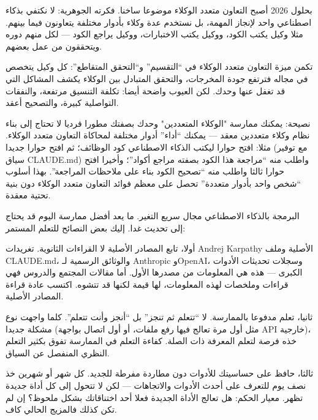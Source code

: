 
بحلول 2026 أصبح التعاون متعدد الوكلاء موضوعا ساخنا. فكرته الجوهرية: لا نكتفي بذكاء اصطناعي واحد لإنجاز المهمة، بل نستخدم عدة وكلاء بأدوار مختلفة يتعاونون فيما بينهم. مثلا وكيل يكتب الكود، ووكيل يكتب الاختبارات، ووكيل يراجع الكود — لكل منهم دوره ويتحققون من عمل بعضهم.

تكمن ميزة التعاون متعدد الوكلاء في “التقسيم” و“التحقق المتقاطع”: كل وكيل يتخصص في مجاله فترتفع جودة المخرجات، والتحقق المتبادل بين الوكلاء يكشف المشاكل التي قد تغفل عنها وحدك. لكن العيوب واضحة أيضا: تكلفة التنسيق مرتفعة، والنفقات التواصلية كبيرة، والتصحيح أعقد.

\begin{tcbinfo}{نصيحة: يمكنك ممارسة "الوكلاء المتعددين" وحدك}
بصفتك مطورا فرديا لا تحتاج إلى بناء نظام وكلاء متعددين معقد — يمكنك “أداء” أدوار مختلفة لمحاكاة التعاون متعدد الوكلاء. مثلا: افتح حوارا ليكتب الذكاء الاصطناعي كود الوظائف؛ ثم افتح حوارا جديدا (مع توفير سياق CLAUDE.md) واطلب منه “مراجعة هذا الكود بصفته مراجع أكواد”؛ وأخيرا افتح حوارا ثالثا واطلب منه “تصحيح الكود بناء على ملاحظات المراجعة”. بهذا أسلوب “شخص واحد بأدوار متعددة” تحصل على معظم فوائد التعاون متعدد الوكلاء دون بنية تحتية معقدة.

\end{tcbinfo}


البرمجة بالذكاء الاصطناعي مجال سريع التغير. ما يعد أفضل ممارسة اليوم قد يحتاج إلى تحديث غدا. إليك بعض النصائح للتعلم المستمر:

أولا، تابع المصادر الأصلية لا القراءات الثانوية. تغريدات Andrej Karpathy الأصلية وملف CLAUDE.md، والوثائق الرسمية لـ Anthropic وOpenAI، وسجلات تحديثات الأدوات الكبرى — هذه هي المعلومات من مصدرها الأول. أما مقالات المجتمع والدروس فهي قراءات وملخصات لهذه المعلومات، لها قيمة لكنها قد تتشوه. اكتسب عادة قراءة المصادر الأصلية.

ثانيا، تعلم مدفوعا بالممارسة. لا “تتعلم ثم تنجز” بل “أنجز وأنت تتعلم”. كلما واجهت نوع مشكلة جديدا (مثل أول مرة تعالج فيها رفع ملفات، أو أول اتصال بواجهة API خارجية)، خذه فرصة لتعلم المعرفة ذات الصلة. كفاءة التعلم في الممارسة تفوق بكثير التعلم النظري المنفصل عن السياق.

ثالثا، حافظ على حساسيتك للأدوات دون مطاردة مفرطة للجديد. كل شهر أو شهرين خذ نصف يوم للتعرف على أحدث الأدوات والاتجاهات — لكن لا تتحول إلى كل أداة جديدة تظهر. معيار الحكم: هل تعالج الأداة الجديدة فعلا أحد اختناقاتك بشكل ملحوظ؟ إن لم تكن كذلك فالمزيج الحالي كاف.

